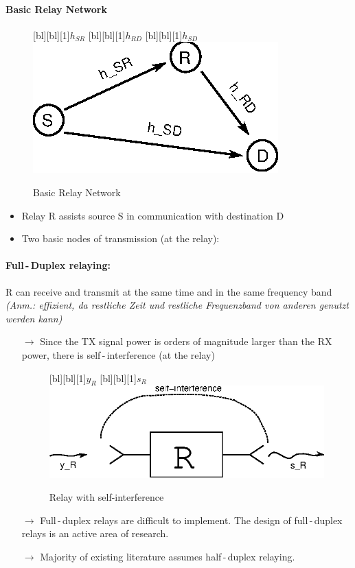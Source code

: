 \documentclass[a4paper, 10pt]{article}
\begin{document}
\paragraph{Basic Relay Network}
\begin{figure}[ht]
	\centering
	[bl][bl][1]{$h_{SR}$}
	[bl][bl][1]{$h_{RD}$}
	[bl][bl][1]{$h_{SD}$}
	\includegraphics[scale=2]{Basic_Relay_Network}	
	\caption{Basic Relay Network}
	\label{fig:basic_relay_network}
\end{figure}
\begin{itemize}
	\item Relay R assists source S in communication with destination D
	\item Two basic nodes of transmission (at the relay):
\end{itemize}
\paragraph{Full\,-\,Duplex relaying:} 
R can receive and transmit at the same time and in the same frequency band \textit{(Anm.: effizient, da restliche Zeit und restliche Frequenzband von anderen genutzt werden kann)}
\begin{itemize}
	\item[$\rightarrow$] Since the TX signal power is orders of magnitude larger than the RX power, there is self\,-\,interference (at the relay) 
		\begin{figure}[ht]
			\centering
			[bl][bl][1]{$y_{R}$}
			[bl][bl][1]{$s_{R}$}
			\includegraphics[scale=1]{Relay_self_interference}	
			\caption{Relay with self-interference}
			\label{fig:relay_self_interference}
		\end{figure}	
	\item[$\rightarrow$] Full\,-\,duplex relays are difficult to implement. The design of full\,-\,duplex relays is an active area of research.
	\item[$\rightarrow$] Majority of existing literature assumes half\,-\,duplex relaying.
\end{itemize}
\end{document}
